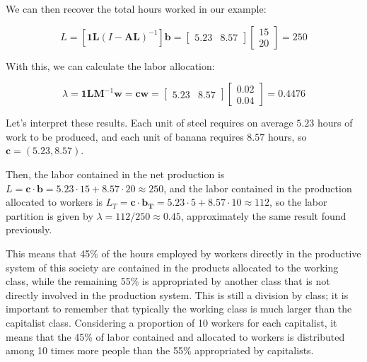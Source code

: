 We can then recover the total hours worked in our example:


\begin{equation}
L=\left[\boldsymbol{1}\boldsymbol{L}\left(I-\boldsymbol{A}\boldsymbol{L}\right)^{-1}\right]\boldsymbol{b}=\left[\begin{array}{cc}
5.23 & 8.57\end{array}\right]\left[\begin{array}{c}
15\\
20
\end{array}\right]=250
\end{equation}

With this, we can calculate the labor allocation:


\begin{equation}
\lambda=\boldsymbol{1}\boldsymbol{L}\boldsymbol{M}^{-1}\boldsymbol{w}=\boldsymbol{c}\boldsymbol{w}=\left[\begin{array}{cc}
5.23 & 8.57\end{array}\right]\left[\begin{array}{c}
0.02\\
0.04
\end{array}\right]=0.4476
\end{equation}

Let's interpret these results. Each unit of steel requires on average $5.23$ hours of work to be produced, and each unit of banana requires $8.57$ hours, so $\boldsymbol{c} = \left(5.23, 8.57\right)$.

Then, the labor contained in the net production is $L = \boldsymbol{c} \cdot \boldsymbol{b} = 5.23 \cdot 15 + 8.57 \cdot 20 \approx 250$,  
and the labor contained in the production allocated to workers is $L_T = \boldsymbol{c} \cdot \boldsymbol{b_T} = 5.23 \cdot 5 + 8.57 \cdot 10 \approx 112$,  
so the labor partition is given by $\lambda = 112 / 250 \approx 0.45$, approximately the same result found previously.

This means that 45\% of the hours employed by workers directly in the productive system of this society are contained in the products allocated to the working class, while the remaining 55\% is appropriated by another class that is not directly involved in the production system. This is still a division by class; it is important to remember that typically the working class is much larger than the capitalist class. Considering a proportion of 10 workers for each capitalist, it means that the 45\% of labor contained and allocated to workers is distributed among 10 times more people than the 55\% appropriated by capitalists.

